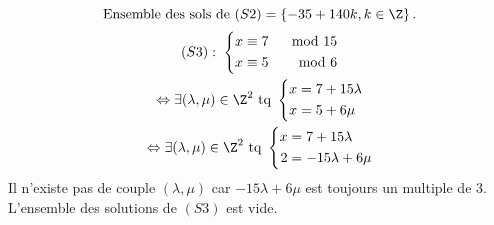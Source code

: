 \[
\text{Ensemble des sols de }(S2) =  \left\lbrace -35 + 140k, k\in \Z \right\rbrace.
\]
\begin{multline*}
  (S3): \;\left\lbrace
  \begin{aligned}
    x &\equiv 7 &\mod 15 \\
    x &\equiv 5 &\mod 6
  \end{aligned}
  \right.\\
\Leftrightarrow
\exists (\lambda, \mu) \in \Z^2 \text{ tq }
  \left\lbrace
  \begin{aligned}
    x &= 7 + 15 \lambda  \\
    x &= 5 + 6\mu
  \end{aligned}
\right.\\
\Leftrightarrow
\exists (\lambda, \mu) \in \Z^2 \text{ tq }
  \left\lbrace
  \begin{aligned}
    x &= 7 + 15 \lambda  \\
    2 &= -15\lambda + 6\mu
  \end{aligned}
\right.
\end{multline*}
Il n'existe pas de couple $(\lambda, \mu)$ car $-15\lambda + 6\mu$ est toujours un multiple de $3$.\newline
L'ensemble des solutions de $(S3)$ est vide.

